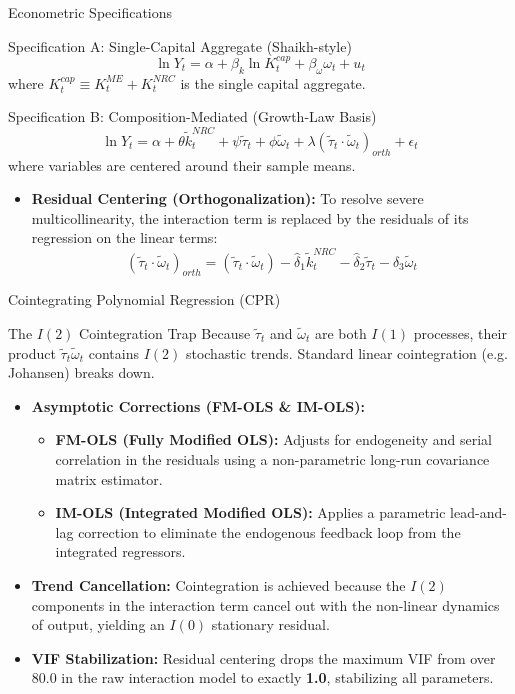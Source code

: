 \documentclass[10pt]{beamer}
\begin{document}
\begin{frame}{Econometric Specifications}
  \begin{block}{Specification A: Single-Capital Aggregate (Shaikh-style)}
    $$\ln Y_t = \alpha + \beta_k \ln K^{cap}_t + \beta_{\omega} \omega_t + u_t$$
    where $K^{cap}_t \equiv K^{ME}_t + K^{NRC}_t$ is the single capital aggregate.
  \end{block}
  \begin{block}{Specification B: Composition-Mediated (Growth-Law Basis)}
    $$\ln Y_t = \alpha + \theta \tilde{k}^{NRC}_t + \psi \tilde{\tau}_t + \phi \tilde{\omega}_t + \lambda (\tilde{\tau}_t \cdot \tilde{\omega}_t)_{orth} + \epsilon_t$$
    where variables are centered around their sample means.
  \end{block}
  \begin{itemize}
    \item \textbf{Residual Centering (Orthogonalization):}
      To resolve severe multicollinearity, the interaction term is replaced by the residuals of its regression on the linear terms:
      $$(\tilde{\tau}_t \cdot \tilde{\omega}_t)_{orth} = (\tilde{\tau}_t \cdot \tilde{\omega}_t) - \hat{\delta}_1 \tilde{k}^{NRC}_t - \hat{\delta}_2 \tilde{\tau}_t - \hat{\delta}_3 \tilde{\omega}_t$$
  \end{itemize}
\end{frame}

\begin{frame}{Cointegrating Polynomial Regression (CPR)}
  \begin{block}{The $I(2)$ Cointegration Trap}
    Because $\tilde{\tau}_t$ and $\tilde{\omega}_t$ are both $I(1)$ processes, their product $\tilde{\tau}_t \tilde{\omega}_t$ contains $I(2)$ stochastic trends. Standard linear cointegration (e.g. Johansen) breaks down.
  \end{block}
  \begin{itemize}
    \item \textbf{Asymptotic Corrections (FM-OLS \& IM-OLS):}
      \begin{itemize}
        \item \textbf{FM-OLS (Fully Modified OLS):} Adjusts for endogeneity and serial correlation in the residuals using a non-parametric long-run covariance matrix estimator.
        \item \textbf{IM-OLS (Integrated Modified OLS):} Applies a parametric lead-and-lag correction to eliminate the endogenous feedback loop from the integrated regressors.
      \end{itemize}
    \item \textbf{Trend Cancellation:} Cointegration is achieved because the $I(2)$ components in the interaction term cancel out with the non-linear dynamics of output, yielding an $I(0)$ stationary residual.
    \item \textbf{VIF Stabilization:} Residual centering drops the maximum VIF from over 80.0 in the raw interaction model to exactly \textbf{1.0}, stabilizing all parameters.
  \end{itemize}
\end{frame}
\end{document}
